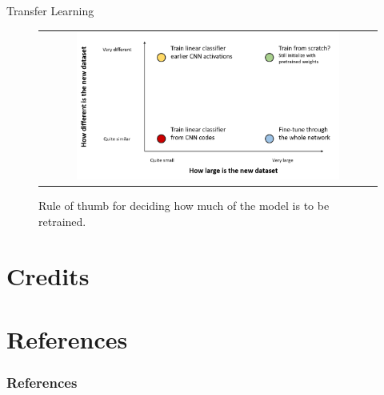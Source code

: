 \documentclass[aspectratio=169]{beamer}
\begin{document}
\begin{frame}{Transfer Learning}
\begin{figure}
\begin{tabular}{c}
\includegraphics[width=0.8\textwidth]{img/cnn/finetuning_rules.png}
\end{tabular}
\caption{Rule of thumb for deciding how much of the model is to be retrained.}
\end{figure}
\end{frame}




\section{Credits}



\section{References}

\begin{frame}[t, allowframebreaks]
\frametitle{References}


\end{frame}
\end{document}
